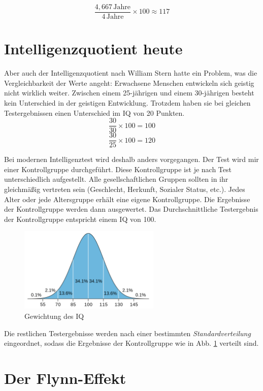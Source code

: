 $$ \frac{4,667\,\mathrm{Jahre}}{4\,\mathrm{Jahre}} \times 100 \approx 117 $$

\section{Intelligenzquotient heute}
Aber auch der Intelligenzquotient nach William Stern hatte ein Problem, was die Vergleichbarkeit der Werte angeht: Erwachsene Menschen entwickeln sich geistig nicht wirklich weiter. Zwischen einem 25-jährigen und einem 30-jährigen besteht kein Unterschied in der geistigen Entwicklung. Trotzdem haben sie bei gleichen Testergebnissen einen Unterschied im IQ von 20 Punkten.
$$ \frac{30}{30} \times 100 = 100 $$
$$ \frac{30}{25} \times 100 = 120 $$

Bei modernen Intelligenztest wird deshalb anders vorgegangen. Der Test wird mir einer Kontrollgruppe durchgeführt. Diese Kontrollgruppe ist je nach Test unterschiedlich aufgestellt. Alle gesellschaftlichen Gruppen sollten in ihr gleichmäßig vertreten sein (Geschlecht, Herkunft, Sozialer Status, etc.). Jedes Alter oder jede Altersgruppe erhält eine eigene Kontrollgruppe. Die Ergebnisse der Kontrollgruppe werden dann ausgewertet. Das Durchschnittliche Testergebnis der Kontrollgruppe entspricht einem IQ von 100.

\begin{figure}[H]
  \centering
  \includegraphics[width=0.6\textwidth]{img/IQ_distribution.png}
  \caption{Gewichtung des IQ \cite{wiki_img_iq}}
  \label{fig:iq}
\end{figure}

Die restlichen Testergebnisse werden nach einer bestimmten \emph{Standardverteilung} eingeordnet, sodass die Ergebnisse der Kontrollgruppe wie in Abb. \ref{fig:iq} verteilt sind.

\section{Der Flynn-Effekt}
\label{sec:flynn}

